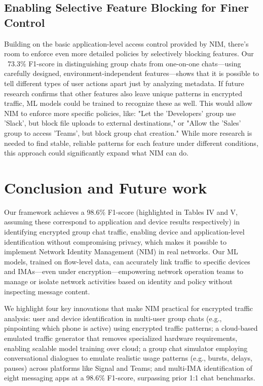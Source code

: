 \documentclass[conference]{IEEEtran}
\begin{document}
\subsection{Enabling Selective Feature Blocking for Finer Control}
Building on the basic application-level access control provided by NIM, there’s room to enforce even more detailed policies by selectively blocking features. Our ~73.3\% F1-score in distinguishing group chats from one-on-one chats—using carefully designed, environment-independent features—shows that it is possible to tell different types of user actions apart just by analyzing metadata. If future research confirms that other features also leave unique patterns in encrypted traffic, ML models could be trained to recognize these as well. This would allow NIM to enforce more specific policies, like: "Let the 'Developers' group use 'Slack', but block file uploads to external destinations," or "Allow the 'Sales' group to access 'Teams', but block group chat creation." While more research is needed to find stable, reliable patterns for each feature under different conditions, this approach could significantly expand what NIM can do.



\section{Conclusion and Future work}
Our framework achieves a 98.6\% F1-score (highlighted in Tables IV and V, assuming these correspond to application and device results respectively) in identifying encrypted group chat traffic, enabling device and application-level identification without compromising privacy, which makes it possible to implement Network Identity Management (NIM) in real networks. Our ML models, trained on flow-level data, can accurately link traffic to specific devices and IMAs—even under encryption—empowering network operation teams to manage or isolate network activities based on identity and policy without inspecting message content.

We highlight four key innovations that make NIM practical for encrypted traffic analysis: user and device identification in multi-user group chats (e.g., pinpointing which phone is active) using encrypted traffic patterns; a cloud-based emulated traffic generator that removes specialized hardware requirements, enabling scalable model training over cloud; a group chat simulator employing conversational dialogues to emulate realistic usage patterns (e.g., bursts, delays, pauses) across platforms like Signal and Teams; and multi-IMA identification of eight messaging apps at a 98.6\% F1-score, surpassing prior 1:1 chat benchmarks.
\end{document}
